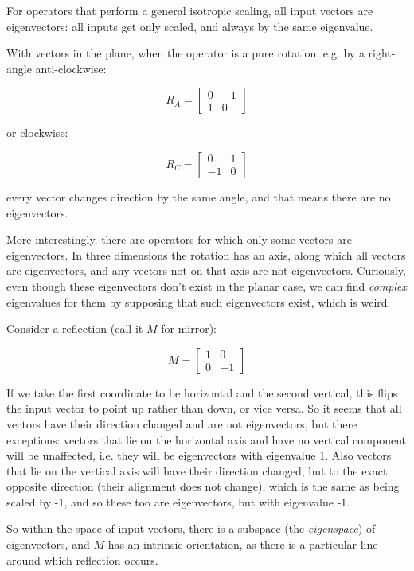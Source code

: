 For operators that perform a general isotropic scaling, all input vectors are eigenvectors: all inputs get only scaled, and always by the same eigenvalue.

With vectors in the plane, when the operator is a pure rotation, e.g. by a right-angle anti-clockwise:

$$R_A = \begin{bmatrix}0 & -1 \\ 1 & 0\end{bmatrix}$$

or clockwise:

$$R_C = \begin{bmatrix}0 & 1 \\ -1 & 0\end{bmatrix}$$

every vector changes direction by the same angle, and that means there are no eigenvectors.

More interestingly, there are operators for which only some vectors are eigenvectors. In three dimensions the rotation has an axis, along which all vectors are eigenvectors, and any vectors not on that axis are not eigenvectors. Curiously, even though these eigenvectors don't exist in the planar case, we can find \textit{complex} eigenvalues for them by supposing that such eigenvectors exist, which is weird.

Consider a reflection (call it $M$ for mirror):

$$M = \begin{bmatrix}1 & 0 \\ 0 & -1\end{bmatrix}$$

If we take the first coordinate to be horizontal and the second vertical, this flips the input vector to point up rather than down, or vice versa. So it seems that all vectors have their direction changed and are not eigenvectors, but there exceptions: vectors that lie on the horizontal axis and have no vertical component will be unaffected, i.e. they will be eigenvectors with eigenvalue 1. Also vectors that lie on the vertical axis will have their direction changed, but to the exact opposite direction (their alignment does not change), which is the same as being scaled by -1, and so these too are eigenvectors, but with eigenvalue -1.

So within the space of input vectors, there is a subspace (the \textit{eigenspace}) of eigenvectors, and $M$ has an intrinsic orientation, as there is a particular line around which reflection occurs.


